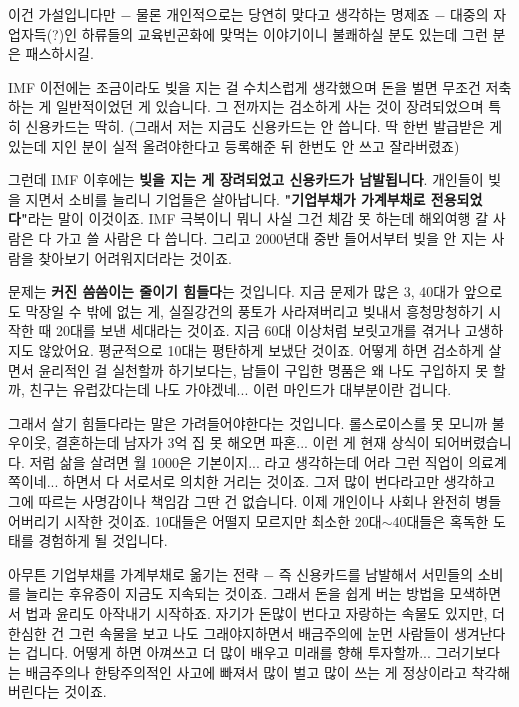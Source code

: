 \vspace{5mm}

이건 가설입니다만 $-$ 물론 개인적으로는 당연히 맞다고 생각하는 명제죠 $-$
대중의 자업자득(?)인 하류들의 교육빈곤화에 맞먹는 이야기이니 불쾌하실 분도 있는데 그런 분은 패스하시길.
\vspace{5mm}

IMF 이전에는 조금이라도 빚을 지는 걸 수치스럽게 생각했으며 돈을 벌면 무조건 저축하는 게 일반적이었던 게 있습니다.
그 전까지는 검소하게 사는 것이 장려되었으며 특히 신용카드는 딱히.
(그래서 저는 지금도 신용카드는 안 씁니다. 딱 한번 발급받은 게 있는데 지인 분이 실적 올려야한다고 등록해준 뒤 한번도 안 쓰고 잘라버렸죠)
\vspace{5mm}

그런데 IMF 이후에는 \textbf{빚을 지는 게 장려되었고 신용카드가 남발됩니다}.
개인들이 빚을 지면서 소비를 늘리니 기업들은 살아납니다. \textbf{"기업부채가 가계부채로 전용되었다"}라는 말이 이것이죠.
IMF 극복이니 뭐니 사실 그건 체감 못 하는데 해외여행 갈 사람은 다 가고 쓸 사람은 다 씁니다.
그리고 2000년대 중반 들어서부터 빚을 안 지는 사람을 찾아보기 어려워지더라는 것이죠.
\vspace{5mm}

문제는 \textbf{커진 씀씀이는 줄이기 힘들다}는 것입니다.
지금 문제가 많은 3, 40대가 앞으로도 막장일 수 밖에 없는 게,
실질강건의 풍토가 사라져버리고 빚내서 흥청망청하기 시작한 때 20대를 보낸 세대라는 것이죠.
지금 60대 이상처럼 보릿고개를 겪거나 고생하지도 않았어요. 평균적으로 10대는 평탄하게 보냈단 것이죠.
어떻게 하면 검소하게 살면서 윤리적인 걸 실천할까 하기보다는,
남들이 구입한 명품은 왜 나도 구입하지 못 할까, 친구는 유럽갔다는데 나도 가야겠네... 이런 마인드가 대부분이란 겁니다.
\vspace{5mm}

그래서 살기 힘들다라는 말은 가려들어야한다는 것입니다.
롤스로이스를 못 모니까 불우이웃, 결혼하는데 남자가 3억 집 못 해오면 파혼... 이런 게 현재 상식이 되어버렸습니다.
저럼 삶을 살려면 월 1000은 기본이지... 라고 생각하는데 어라 그런 직업이 의료계 쪽이네... 하면서 다 서로서로 의치한 거리는 것이죠.
그저 많이 번다라고만 생각하고 그에 따르는 사명감이나 책임감 그딴 건 없습니다.
이제 개인이나 사회나 완전히 병들어버리기 시작한 것이죠.
10대들은 어떨지 모르지만 최소한 20대$\sim$40대들은 혹독한 도태를 경험하게 될 것입니다.
\vspace{5mm}

아무튼 기업부채를 가계부채로 옮기는 전략 $-$ 즉 신용카드를 남발해서 서민들의 소비를 늘리는 후유증이 지금도 지속되는 것이죠.
그래서 돈을 쉽게 버는 방법을 모색하면서 법과 윤리도 아작내기 시작하죠.
자기가 돈많이 번다고 자랑하는 속물도 있지만, 더 한심한 건 그런 속물을 보고 나도 그래야지하면서 배금주의에 눈먼 사람들이 생겨난다는 겁니다.
어떻게 하면 아껴쓰고 더 많이 배우고 미래를 향해 투자할까... 그러기보다는
배금주의나 한탕주의적인 사고에 빠져서 많이 벌고 많이 쓰는 게 정상이라고 착각해버린다는 것이죠.
\vspace{5mm}

